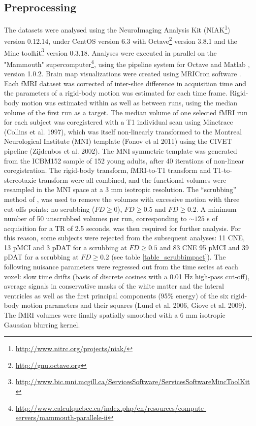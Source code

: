 \documentclass[authoryear,preprint,review]{elsarticle}
\begin{document}
\subsection{Preprocessing} The datasets were analysed using the NeuroImaging Analysis Kit (NIAK\footnote{\url{http://www.nitrc.org/projects/niak/}}) version 0.12.14, under CentOS version 6.3 with Octave\footnote{\url{http://gnu.octave.org}} version 3.8.1 and the Minc toolkit\footnote{\url{http://www.bic.mni.mcgill.ca/ServicesSoftware/ServicesSoftwareMincToolKit}} version 0.3.18. Analyses were executed in parallel on the "Mammouth" supercomputer\footnote{\url{http://www.calculquebec.ca/index.php/en/resources/compute-servers/mammouth-parallele-ii}}, using the pipeline system for Octave and Matlab \citep{Bellec2012}, version 1.0.2. Brain map visualizations were created using MRICron software \cite{Rorden2007}. Each fMRI dataset was corrected of inter-slice difference in acquisition time and the parameters of a rigid-body motion was estimated for each time frame. Rigid-body motion was estimated within as well as between runs, using the median volume of the first run as a target. The median volume of one selected fMRI run for each subject was coregistered with a T1 individual scan using 
Minctracc (Collins et al. 1997), which was itself non-linearly transformed to the Montreal Neurological Institute (MNI) template (Fonov et al 2011) using the CIVET pipeline (Zijdenbos et al. 2002). The MNI symmetric template was generated from the ICBM152 sample of 152 young adults, after 40 iterations of non-linear coregistration. The rigid-body transform, fMRI-to-T1 transform and T1-to-stereotaxic transform were all combined, and the functional volumes were resampled in the MNI space at a 3 mm isotropic resolution. The “scrubbing” method of \cite{Power2012}, was used to remove the volumes with excessive motion with three cut-offs points: no scrubbing ($FD\geq0$), $FD\geq0.5$ and $FD\geq0.2$. A minimum number of 50 unscrubbed volumes per run, corresponding to $\sim 125$ s of acquisition for a TR of 2.5 seconds, was then required for further analysis. For this reason, some subjects were rejected from the subsequent analyses: 11 CNE, 13 pMCI and 3 pDAT for a scrubbing at $FD\geq0.5$ and 83 CNE 95 pMCI and 39 
pDAT for a scrubbing at $FD\geq0.2$ (see table \ref{table_scrubbimpact}). The following nuisance parameters were regressed out from the time series at each voxel: slow time drifts (basis of discrete cosines with a 0.01 Hz high-pass cut-off), average signals in conservative masks of the white matter and the lateral ventricles as well as the first principal components (95\% energy) of the six rigid-body motion parameters and their squares (Lund et al. 2006, Giove et al. 2009). The fMRI volumes were finally spatially smoothed with a 6 mm isotropic Gaussian blurring kernel. 
\end{document}
